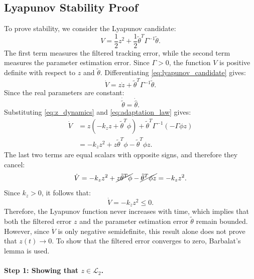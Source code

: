 \subsection{Lyapunov Stability Proof}

To prove stability, we consider the Lyapunov candidate:
\begin{equation}
V
=
\frac{1}{2}z^2
+
\frac{1}{2}\tilde{\theta}^{T}\Gamma^{-1}\tilde{\theta}.
\label{eq:lyapunov_candidate}
\end{equation}
The first term measures the filtered tracking error, while the second term measures the parameter estimation error. Since \(\Gamma>0\), the function \(V\) is positive definite with respect to \(z\) and \(\tilde{\theta}\). Differentiating \eqref{eq:lyapunov_candidate} gives:
\begin{equation}
\dot{V}
=
z\dot{z}
+
\tilde{\theta}^{T}\Gamma^{-1}\dot{\tilde{\theta}}.
\end{equation}
Since the real parameters are constant:
\begin{equation}
\dot{\tilde{\theta}}
=
\dot{\hat{\theta}}.
\end{equation}
Substituting \eqref{eq:z_dynamics} and \eqref{eq:adaptation_law} gives:
\begin{align}
\dot{V}
&=
z
\left(
-k_z z
+
\tilde{\theta}^{T}\phi
\right)
+
\tilde{\theta}^{T}\Gamma^{-1}
\left(
-\Gamma\phi z
\right)\\
&=
-k_z z^2
+
z\tilde{\theta}^{T}\phi
-
\tilde{\theta}^{T}\phi z.
\end{align}
The last two terms are equal scalars with opposite signs, and therefore they cancel:
\begin{equation}
\dot{V}
=
-k_z z^2
+
\cancel{z\tilde{\theta}^{T}\phi}
-
\cancel{\tilde{\theta}^{T}\phi z}
=
-k_z z^2.
\label{eq:lyapunov_derivative}
\end{equation}
Since \(k_z>0\), it follows that:
\[
\dot{V}
=
-k_zz^2
\le0.
\]
Therefore, the Lyapunov function never increases with time, which implies that both the filtered error \(z\) and the parameter estimation error \(\tilde{\theta}\) remain bounded. However, since \(\dot{V}\) is only negative semidefinite, this result alone does not prove that \(z(t) \rightarrow 0\). To show that the filtered error converges to zero, Barbalat's lemma is used.

\paragraph{Step 1: Showing that \(z\in\mathcal{L}_2\).}

